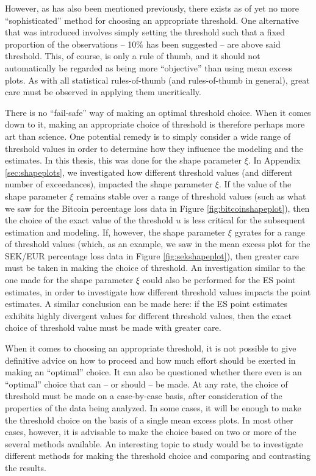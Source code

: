 \documentclass[a4paper,11pt]{article}
\theoremstyle{definition}
\theoremstyle{definition}
\theoremstyle{definition}
\theoremstyle{definition}
\theoremstyle{remark}
\begin{document}
However, as has also been mentioned previously, there exists as of yet no more ``sophisticated'' method for choosing an appropriate threshold. One alternative that was introduced involves simply setting the threshold such that a fixed proportion of the observations -- 10\% has been suggested -- are above said threshold. This, of course, is only a rule of thumb, and it should not automatically be regarded as being more ``objective'' than using mean excess plots. As with all statistical rules-of-thumb (and rules-of-thumb in general), great care must be observed in applying them uncritically.

There is no ``fail-safe'' way of making an optimal threshold choice. When it comes down to it, making an appropriate choice of threshold is therefore perhaps more art than science. One potential remedy is to simply consider a wide range of threshold values in order to determine how they influence the modeling and the estimates. In this thesis, this was done for the shape parameter \(\xi\). In Appendix \ref{sec:shapeplots}, we investigated how different threshold values (and different number of exceedances), impacted the shape parameter \(\xi\). If the value of the shape parameter \(\xi\) remains stable over a range of threshold values (such as what we saw for the Bitcoin percentage loss data in Figure \ref{fig:bitcoinshapeplot}), then the choice of the exact value of the threshold \(u\) is less critical for the subsequent estimation and modeling. If, however, the shape parameter \(\xi\) gyrates for a range of threshold values (which, as an example, we saw in the mean excess plot for the SEK/EUR percentage loss data in Figure \ref{fig:sekshapeplot}), then greater care must be taken in making the choice of threshold. An investigation similar to the one made for the shape parameter \(\xi\) could also be performed for the ES point estimates, in order to investigate how different threshold values impacts the point estimates. A similar conclusion can be made here: if the ES point estimates exhibits highly divergent values for different threshold values, then the exact choice of threshold value must be made with greater care.

When it comes to choosing an appropriate threshold, it is not possible to give definitive advice on how to proceed and how much effort should be exerted in making an ``optimal'' choice. It can also be questioned whether there even is an ``optimal'' choice that can -- or should -- be made. At any rate, the choice of threshold must be made on a case-by-case basis, after consideration of the properties of the data being analyzed. In some cases, it will be enough to make the threshold choice on the basis of a single mean excess plots. In most other cases, however, it is advisable to make the choice based on two or more of the several methods available. An interesting topic to study would be to investigate different methods for making the threshold choice and comparing and contrasting the results.
\end{document}
